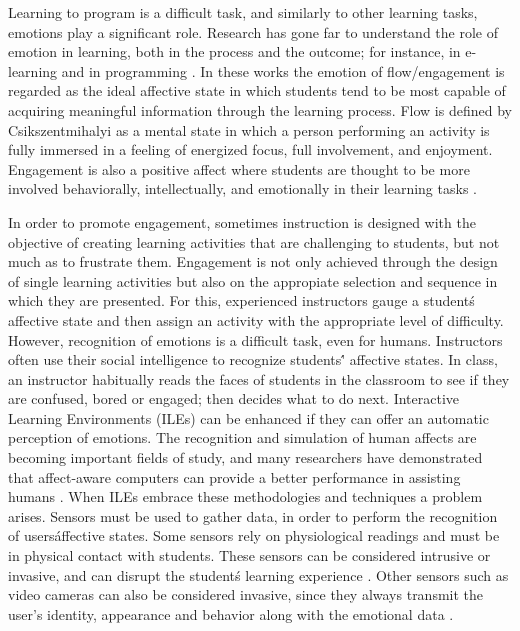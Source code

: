 \documentclass[a4paper,twoside]{article}
\begin{document}
Learning to program is a difficult task, and similarly to other
learning tasks, emotions play a significant
role. Research has gone far to understand the role of emotion in learning, both
in the process and the outcome; for instance, in e-learning
\cite{kort2001affective, rossin2009effects}
and in programming  \cite{rodrigo2009affective, jenkins2001motivation ,
bosch2013emotions, khan2007mood}. In these works the emotion of flow/engagement
is regarded as the ideal affective state in which
students tend to be most capable of acquiring meaningful information through the
learning process. Flow is defined by Csikszentmihalyi \cite{csikszentmihalyi1990flow}
as a mental state in which a person performing an activity is fully immersed in a feeling of energized focus, full involvement, and enjoyment. Engagement is
also a positive affect where students are thought to be more involved
behaviorally, intellectually, and emotionally in their learning tasks
\cite{bangert2002teacher}.

In order to promote engagement, sometimes instruction is designed with the
objective of creating learning activities that are challenging to students, but
not much as to frustrate them. Engagement is not only achieved through the
design of single learning activities but also on the appropiate selection and
sequence in which they are presented.
For this, experienced instructors gauge a student\'s affective state and then
assign an activity with the appropriate level of difficulty. However,
recognition of emotions is a difficult task, even
for humans. Instructors often use their social intelligence to recognize
students\'' affective states. In class, an instructor habitually reads the
faces of students in the classroom to see if they are confused, bored or
engaged; then decides what to do next. Interactive Learning Environments (ILEs)
can be enhanced if they can offer an
automatic perception of emotions. The recognition and simulation of human
affects are becoming important fields of study, and many researchers have
demonstrated that affect-aware computers can provide a better performance in
assisting humans \cite{picard2001toward}. When ILEs embrace these methodologies
and techniques a
problem arises. Sensors must be used to gather data, in order to perform the
recognition of users\' affective states.
Some sensors rely on physiological readings
and must be in physical contact with students.
These sensors can be considered
intrusive or invasive, and can disrupt the student\'s learning experience
\cite{zhai2008stress, sidney2005integrating, arroyo2009emotion}.
Other sensors such as video cameras can also be considered invasive, since
they always transmit the user's identity, appearance and behavior along with
the emotional data \cite{picard2001toward}.
\end{document}
